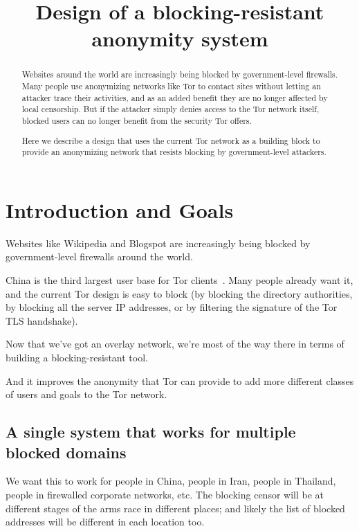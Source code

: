 \documentclass{llncs}
\begin{document}
\title{Design of a blocking-resistant anonymity system}

\author{}

\maketitle
\pagestyle{plain}

\begin{abstract}

Websites around the world are increasingly being blocked by
government-level firewalls. Many people use anonymizing networks like
Tor to contact sites without letting an attacker trace their activities,
and as an added benefit they are no longer affected by local censorship.
But if the attacker simply denies access to the Tor network itself,
blocked users can no longer benefit from the security Tor offers.

Here we describe a design that uses the current Tor network as a
building block to provide an anonymizing network that resists blocking
by government-level attackers.

\end{abstract}

\section{Introduction and Goals}

Websites like Wikipedia and Blogspot are increasingly being blocked by
government-level firewalls around the world.

China is the third largest user base for Tor clients~\cite{geoip-tor}.
Many people already want it, and the current Tor design is easy to block
(by blocking the directory authorities, by blocking all the server
IP addresses, or by filtering the signature of the Tor TLS handshake).

Now that we've got an overlay network, we're most of the way there in
terms of building a blocking-resistant tool.

And it improves the anonymity that Tor can provide to add more different
classes of users and goals to the Tor network.

\subsection{A single system that works for multiple blocked domains}

We want this to work for people in China, people in Iran, people in
Thailand, people in firewalled corporate networks, etc. The blocking
censor will be at different stages of the arms race in different places;
and likely the list of blocked addresses will be different in each
location too.
\end{document}

